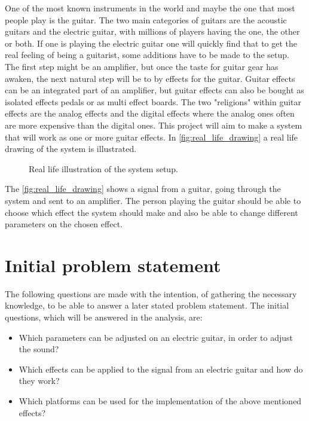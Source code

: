 One of the most known instruments in the world and maybe the one that most people play is the guitar. The two main categories of guitars are the acoustic guitars and the electric guitar, with millions of players having the one, the other or both. If one is playing the electric guitar one will quickly find that to get the real feeling of being a guitarist, some additions have to be made to the setup. The first step might be an amplifier, but once the taste for guitar gear has awaken, the next natural step will be to by effects for the guitar. Guitar effects can be an integrated part of an amplifier, but guitar effects can also be bought as isolated effects pedals or as multi effect boards. The two "religions" within guitar effects are the analog effects and the digital effects where the analog ones often are more expensive than the digital ones. 
This project will aim to make a system that will work as one or more guitar effects. In \autoref{fig:real_life_drawing} a real life drawing of the system is illustrated.

\begin{figure}[htbp]
\centering
\def\svgwidth{\columnwidth}
\scalebox{0.7}{}
\caption{Real life illustration of the system setup.}
		\label{fig:real_life_drawing}
\end{figure}

The \autoref{fig:real_life_drawing} shows a signal from a guitar, going through the system and sent to an amplifier. The person playing the guitar should be able to choose which effect the system should make and also be able to change different parameters on the chosen effect. 



\section{Initial problem statement}
The following questions are made with the intention, of gathering the necessary knowledge, to be able to answer a later stated problem statement. The initial questions, which will be answered in the analysis, are:

\begin{itemize}
\item Which parameters can be adjusted on an electric guitar, in order to adjust the sound?
\item Which effects can be applied to the signal from an electric guitar and how do they work?
\item Which platforms can be used for the implementation of the above mentioned effects? 
\end{itemize}